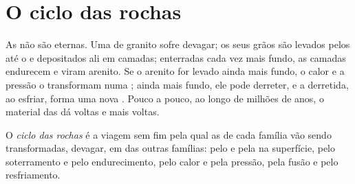 \section{O ciclo das rochas}

As  não são eternas. Uma  de granito sofre 
devagar; os seus grãos são levados pelos  até o  e depositados ali
em camadas; enterradas cada vez mais fundo, as camadas endurecem e viram
arenito. Se o arenito for levado ainda mais fundo, o calor e a pressão o
transformam numa ; ainda mais fundo, ele pode derreter,
e a  derretida, ao esfriar, forma uma nova . Pouco a
pouco, ao longo de milhões de anos, o material das  dá voltas e
mais voltas.

\begin{definition}\label{def:g6:rocks-and-minerals:rock-cycle}
O \emph{ciclo das rochas} é a viagem sem fim pela
qual as  de cada família vão sendo transformadas, devagar, em 
das outras famílias: pelo  e pela  na superfície, pelo
soterramento e pelo endurecimento, pelo calor e pela pressão, pela fusão e
pelo resfriamento.
\end{definition}

